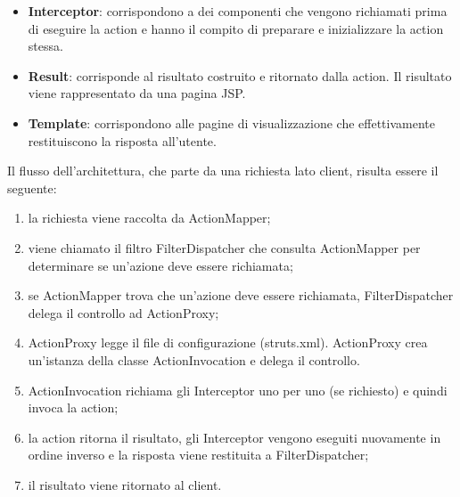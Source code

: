 \begin{itemize}
\item \textbf{Interceptor}: corrispondono a dei componenti che vengono richiamati prima di eseguire la action e hanno il compito di preparare e inizializzare la action stessa.
\setlength{\parskip}{3ex}

\item \textbf{Result}: corrisponde al risultato costruito e ritornato dalla action. Il risultato viene rappresentato da una pagina JSP.
\setlength{\parskip}{3ex}

\item \textbf{Template}: corrispondono alle pagine di visualizzazione che effettivamente restituiscono la risposta all'utente.
\setlength{\parskip}{3ex}

\end{itemize}

\pagebreak

\noindent Il flusso dell'architettura, che parte da una richiesta lato client, risulta essere il seguente:
\begin{enumerate}
\item la richiesta viene raccolta da ActionMapper;

\item viene chiamato il filtro FilterDispatcher che consulta ActionMapper per determinare se un'azione deve essere richiamata;

\item se ActionMapper trova che un'azione deve essere richiamata, FilterDispatcher delega il controllo ad ActionProxy;

\item ActionProxy legge il file di configurazione (struts.xml). ActionProxy crea un'istanza della classe ActionInvocation e delega il controllo.

\item ActionInvocation richiama gli Interceptor uno per uno (se richiesto) e quindi invoca la action;

\item la action ritorna il risultato, gli Interceptor vengono eseguiti nuovamente in ordine inverso e la risposta viene restituita a FilterDispatcher;

\item il risultato viene ritornato al client.
\end{enumerate}

\pagebreak
